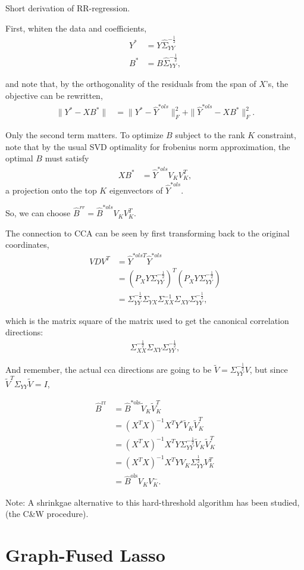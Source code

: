 \documentclass{scrartcl}
\begin{document}
Short derivation of RR-regression. 

First, whiten the data and coefficients,
\begin{align}
  Y^{\ast} &= Y\hat{\Sigma}_{YY}^{-\frac{1}{2}} \\
  B^{\ast} &= B\hat{\Sigma}_{YY}^{-\frac{1}{2}},
\end{align}

and note that, by the orthogonality of the residuals
from the span of $X$'s, the objective can be rewritten,
\begin{align}
  \|Y^{\ast} - XB^{\ast}\| &= \|Y^{\ast} - \hat{Y}^{* ols}\|_{F}^{2} + \|\hat{Y}^{\ast ols} - XB^{\ast}\|_{F}^{2}.
\end{align}

Only the second term matters. To optimize $B$ subject to the
rank $K$ constraint, note that by the usual SVD optimality
for frobenius norm approximation, the optimal $B$ must satisfy
\begin{align}
  XB^{\ast} &= \hat{Y}^{\ast ols}V_{K}V_{K}^{T},
\end{align}
a projection onto the top $K$ eigenvectors of $\hat{Y}^{\ast ols}$.

So, we can choose $\hat{B}^{rr} = \hat{B}^{\ast ols}V_{K}V_{K}^{T}$.

The connection to CCA can be seen by first transforming back
to the original coordinates,
\begin{align}
  VDV^{T} &= \hat{Y}^{\ast ols T}\hat{Y}^{\ast ols} \\
  &= \left(P_{X}Y\Sigma_{YY}^{-\frac{1}{2}}\right)^{T}\left(P_{X}Y\Sigma_{YY}^{-\frac{1}{2}}\right) \\
  &= \Sigma_{YY}^{-\frac{1}{2}}\Sigma_{YX}\Sigma_{XX}^{-1}\Sigma_{XY}\Sigma_{YY}^{-\frac{1}{2}},
\end{align}

which is the matrix square of the matrix used to get the canonical correlation
directions:
\begin{align}
  \Sigma_{XX}^{-\frac{1}{2}}\Sigma_{XY}\Sigma_{YY}^{-\frac{1}{2}},
\end{align}

And remember, the actual cca directions are going to be
$\tilde{V} = \Sigma_{YY}^{-\frac{1}{2}}V$, but since
$\tilde{V}^{T}\Sigma_{YY}\tilde{V} = I$, 

\begin{align}
\hat{B}^{\text{rr}} &= \hat{B}^{\ast \text{ols}}\tilde{V}_{K}\tilde{V}_{K}^{T} \\
&= \left(X^{T}X\right)^{-1}X^{T}Y^{\ast}\tilde{V}_{K}\tilde{V}_{K}^{T} \\
&= \left(X^{T}X\right)^{-1}X^{T}Y\Sigma_{YY}^{-\frac{1}{2}}\tilde{V}_{K}\tilde{V}_{K}^{T} \\
&= \left(X^{T}X\right)^{-1}X^{T}Y V_{K} \Sigma_{YY}^{\frac{1}{2}}V_{K}^{T} \\
&= \hat{B}^{\text{ols}}V_{K}V_{K}^{-}.
\end{align}

Note: A shrinkgae alternative to this hard-threshold algorithm has been studied,
(the C\&W procedure).

\section{Graph-Fused Lasso}




\begin{frame}
  \frametitle{}
\end{frame}
\end{document}
